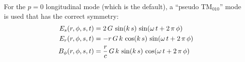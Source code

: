 For the $p = 0$ longitudinal mode (which is the default), a ``pseudo TM$_{010}$'' mode is used that
has the correct symmetry:
\begin{align}
  E_s(r, \phi, s, t)    &= 2 \, G \,                \sin(k \, s) \, \sin(\omega \, t + 2 \, \pi \, \phi) \nonumber \\
  E_r(r, \phi, s, t)    &= -r \, G \, k \,          \cos(k \, s) \, \sin(\omega \, t + 2 \, \pi \, \phi) \\
  B_\phi(r, \phi, s, t) &= \frac{r}{c} \, G \, k \, \sin(k \, s) \, \cos(\omega \, t + 2 \, \pi \, \phi) \nonumber
  \label{egot3}
\end{align}
